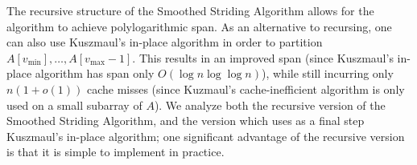 \documentclass[11pt]{article}
\newcommand{\defn}[1]{{\textit{\textbf{\boldmath #1}}} }
\theoremstyle{remark}
\theoremstyle{remark}
\begin{document}
The recursive structure of the Smoothed Striding Algorithm allows for
the algorithm to achieve polylogarithmic span. As an alternative to
recursing, one can also use Kuszmaul's in-place algorithm in order to partition \\ $A[v_{\text{min}}], \ldots,
  A[v_{\text{max}} - 1]$. This results in an improved span (since Kuszmaul's
in-place algorithm has span only $O(\log n \log \log
n)$), while still incurring only $n (1 + o(1))$ cache misses (since
Kuzmaul's cache-inefficient algorithm is only used
on a small subarray of $A$). We analyze both the recursive version of
the Smoothed Striding Algorithm, and the version which uses as a final
step Kuszmaul's in-place algorithm; one significant advantage
of the recursive version is that it is simple to implement in
practice.







\end{document}
